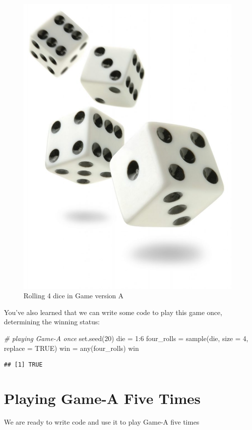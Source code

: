 \documentclass[
]{book}
\newenvironment{Shaded}{\begin{snugshade}}{\end{snugshade}}
\newcommand{\AttributeTok}[1]{\textcolor[rgb]{0.77,0.63,0.00}{#1}}
\newcommand{\CommentTok}[1]{\textcolor[rgb]{0.56,0.35,0.01}{\textit{#1}}}
\newcommand{\ConstantTok}[1]{\textcolor[rgb]{0.00,0.00,0.00}{#1}}
\newcommand{\DecValTok}[1]{\textcolor[rgb]{0.00,0.00,0.81}{#1}}
\newcommand{\FunctionTok}[1]{\textcolor[rgb]{0.00,0.00,0.00}{#1}}
\newcommand{\NormalTok}[1]{#1}
\newcommand{\OtherTok}[1]{\textcolor[rgb]{0.56,0.35,0.01}{#1}}
\newcommand{\SpecialCharTok}[1]{\textcolor[rgb]{0.00,0.00,0.00}{#1}}
\begin{document}
\begin{figure}

{\centering \includegraphics[width=0.25\linewidth]{images/rolling-four-dice} 

}

\caption{Rolling 4 dice in Game version A}\label{fig:unnamed-chunk-19}
\end{figure}

You've also learned that we can write some code to play this game once,
determining the winning status:

\begin{Shaded}
\begin{Highlighting}[]
\CommentTok{\# playing Game{-}A once}
\FunctionTok{set.seed}\NormalTok{(}\DecValTok{20}\NormalTok{)}
\NormalTok{die }\OtherTok{=} \DecValTok{1}\SpecialCharTok{:}\DecValTok{6}
\NormalTok{four\_rolls }\OtherTok{=} \FunctionTok{sample}\NormalTok{(die, }\AttributeTok{size =} \DecValTok{4}\NormalTok{, }\AttributeTok{replace =} \ConstantTok{TRUE}\NormalTok{)}
\NormalTok{win }\OtherTok{=} \FunctionTok{any}\NormalTok{(four\_rolls)}
\NormalTok{win}
\end{Highlighting}
\end{Shaded}

\begin{verbatim}
## [1] TRUE
\end{verbatim}

\hypertarget{playing-game-a-five-times}{%
\section{Playing Game-A Five Times}\label{playing-game-a-five-times}}

We are ready to write code and use it to play Game-A five times
\end{document}
